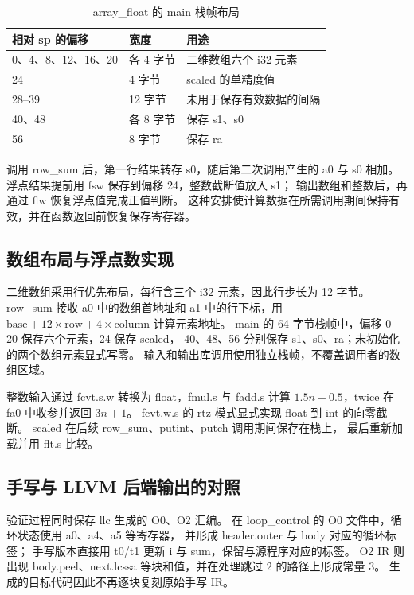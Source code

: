 \begin{table}[htbp]
\centering\small
\caption{array\_float 的 main 栈帧布局}
\begin{tabular}{lll}
\toprule
相对 sp 的偏移 & 宽度 & 用途\\
\midrule
0、4、8、12、16、20 & 各 4 字节 & 二维数组六个 i32 元素\\
24 & 4 字节 & scaled 的单精度值\\
28--39 & 12 字节 & 未用于保存有效数据的间隔\\
40、48 & 各 8 字节 & 保存 s1、s0\\
56 & 8 字节 & 保存 ra\\
\bottomrule
\end{tabular}
\end{table}

调用 row\_sum 后，第一行结果转存 s0，随后第二次调用产生的 a0 与 s0 相加。
浮点结果提前用 fsw 保存到偏移 24，整数截断值放入 s1；
输出数组和整数后，再通过 flw 恢复浮点值完成正值判断。
这种安排使计算数据在所需调用期间保持有效，并在函数返回前恢复保存寄存器。

\subsection{数组布局与浮点数实现}
二维数组采用行优先布局，每行含三个 i32 元素，因此行步长为 12 字节。
row\_sum 接收 a0 中的数组首地址和 a1 中的行下标，用
$\mathrm{base}+12\times\mathrm{row}+4\times\mathrm{column}$ 计算元素地址。
main 的 64 字节栈帧中，偏移 0--20 保存六个元素，24 保存 scaled，
40、48、56 分别保存 s1、s0、ra；未初始化的两个数组元素显式写零。
输入和输出库调用使用独立栈帧，不覆盖调用者的数组区域。

整数输入通过 fcvt.s.w 转换为 float，fmul.s 与 fadd.s 计算
$1.5n+0.5$，twice 在 fa0 中收参并返回 $3n+1$。
fcvt.w.s 的 rtz 模式显式实现 float 到 int 的向零截断。
scaled 在后续 row\_sum、putint、putch 调用期间保存在栈上，
最后重新加载并用 flt.s 比较。

\subsection{手写与 LLVM 后端输出的对照}
验证过程同时保存 llc 生成的 O0、O2 汇编。
在 loop\_control 的 O0 文件中，循环状态使用 a0、a4、a5 等寄存器，
并形成 header.outer 与 body 对应的循环标签；
手写版本直接用 t0/t1 更新 i 与 sum，保留与源程序对应的标签。
O2 IR 则出现 body.peel、next.lcssa 等块和值，并在处理跳过 2 的路径上形成常量 3。
生成的目标代码因此不再逐块复刻原始手写 IR。


